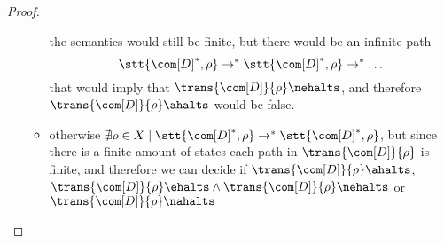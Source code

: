 \begin{proof}
\begin{itemize}
\begin{itemize}
      \stt{\com[D]^*, \rho}\) the semantics would still be finite, but
      there would be an infinite path \[\stt{\com[D]^*, \rho} \to^*
      \stt{\com[D]^*, \rho} \to^* \dots\] that would imply that
      \(\trans{\com[D]}{\rho} \nehalts\), and therefore
      \(\trans{\com[D]}{\rho} \ahalts\) would be false.
    \item otherwise \(\nexists \rho \in X \mid \stt{\com[D]^*, \rho}
      \to^* \stt{\com[D]^*, \rho}\), but since there is a finite
      amount of states each path in \(\trans{\com[D]}{\rho}\) is
      finite, and therefore we can decide if
      \(\trans{\com[D]}{\rho}\ahalts\), \(\trans{\com[D]}{\rho}\ehalts
      \wedge \trans{\com[D]}{\rho}\nehalts\) or
      \(\trans{\com[D]}{\rho}\nahalts\)
    \end{itemize}
  \end{itemize}
\end{proof}
